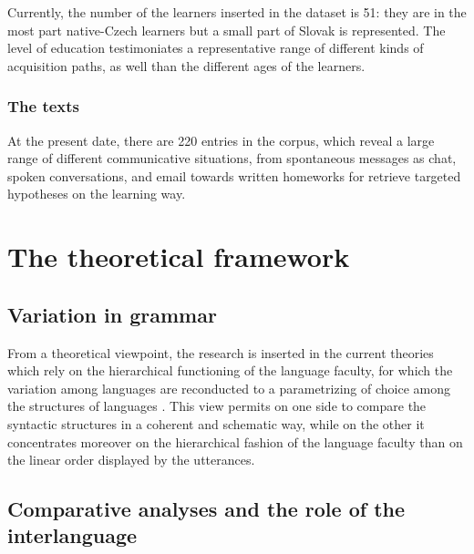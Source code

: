 \documentclass[a4paper,twoside,11pt,chapterprefix=true,listof=totocnumbered,bibliography=totocnumbered]{scrbook}
\theoremstyle{definition}
\theoremstyle{definition}
\theoremstyle{definition}
\theoremstyle{remark}
\begin{document}
Currently, the number of the learners inserted in the dataset is 51:
they are in the most part native-Czech learners but a small part of
Slovak is represented. The level of education testimoniates a
representative range of different kinds of acquisition paths, as well
than the different ages of the learners.

\subsubsection{The texts}\label{the-texts}

At the present date, there are 220 entries in the corpus, which reveal a
large range of different communicative situations, from spontaneous
messages as chat, spoken conversations, and email towards written
homeworks for retrieve targeted hypotheses on the learning way.

\section{The theoretical framework}\label{the-theoretical-framework}

\subsection{Variation in grammar}\label{variation-in-grammar}

From a theoretical viewpoint, the research is inserted in the current
theories which rely on the hierarchical functioning of the language
faculty, for which the variation among languages are reconducted to a
parametrizing of choice among the structures of languages
\citep[\citet{chomsky1998}, \citet{chomsky2013}, \citet{chomsky2015},
\citet{adger2011}, \citet{rizzi2013}]{chomsky1995}. This view permits on
one side to compare the syntactic structures in a coherent and schematic
way, while on the other it concentrates moreover on the hierarchical
fashion of the language faculty than on the linear order displayed by
the utterances.

\subsection{Comparative analyses and the role of the
interlanguage}\label{comparative-analyses-and-the-role-of-the-interlanguage}
\end{document}
